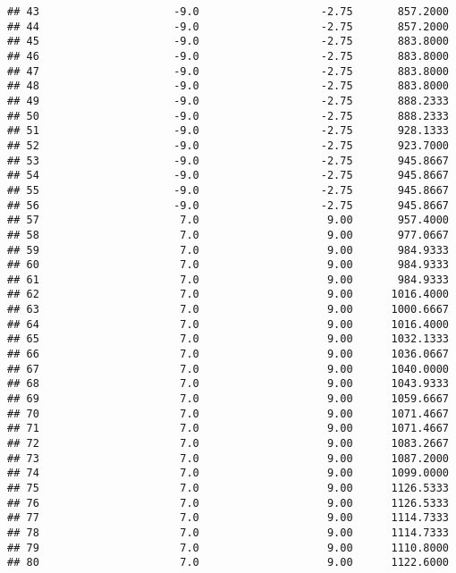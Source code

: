 \documentclass[]{article}
\begin{document}
\begin{verbatim}
## 43                     -9.0                   -2.75       857.2000
## 44                     -9.0                   -2.75       857.2000
## 45                     -9.0                   -2.75       883.8000
## 46                     -9.0                   -2.75       883.8000
## 47                     -9.0                   -2.75       883.8000
## 48                     -9.0                   -2.75       883.8000
## 49                     -9.0                   -2.75       888.2333
## 50                     -9.0                   -2.75       888.2333
## 51                     -9.0                   -2.75       928.1333
## 52                     -9.0                   -2.75       923.7000
## 53                     -9.0                   -2.75       945.8667
## 54                     -9.0                   -2.75       945.8667
## 55                     -9.0                   -2.75       945.8667
## 56                     -9.0                   -2.75       945.8667
## 57                      7.0                    9.00       957.4000
## 58                      7.0                    9.00       977.0667
## 59                      7.0                    9.00       984.9333
## 60                      7.0                    9.00       984.9333
## 61                      7.0                    9.00       984.9333
## 62                      7.0                    9.00      1016.4000
## 63                      7.0                    9.00      1000.6667
## 64                      7.0                    9.00      1016.4000
## 65                      7.0                    9.00      1032.1333
## 66                      7.0                    9.00      1036.0667
## 67                      7.0                    9.00      1040.0000
## 68                      7.0                    9.00      1043.9333
## 69                      7.0                    9.00      1059.6667
## 70                      7.0                    9.00      1071.4667
## 71                      7.0                    9.00      1071.4667
## 72                      7.0                    9.00      1083.2667
## 73                      7.0                    9.00      1087.2000
## 74                      7.0                    9.00      1099.0000
## 75                      7.0                    9.00      1126.5333
## 76                      7.0                    9.00      1126.5333
## 77                      7.0                    9.00      1114.7333
## 78                      7.0                    9.00      1114.7333
## 79                      7.0                    9.00      1110.8000
## 80                      7.0                    9.00      1122.6000

\end{verbatim}
\end{document}
